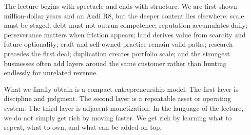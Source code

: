 The lecture begins with spectacle and ends with structure. We are first shown million-dollar years and an Audi R8, but the deeper content lies elsewhere: scale must be staged; debt must not outrun competence; reputation accumulates daily; perseverance matters when friction appears; land derives value from scarcity and future optionality; craft and self-owned practice remain valid paths; research precedes the first deal; duplication creates portfolio scale; and the strongest businesses often add layers around the same customer rather than hunting endlessly for unrelated revenue.

What we finally obtain is a compact entrepreneurship model. The first layer is discipline and judgment. The second layer is a repeatable asset or operating system. The third layer is adjacent monetization. In the language of the lecture, we do not simply get rich by moving faster. We get rich by learning what to repeat, what to own, and what can be added on top.